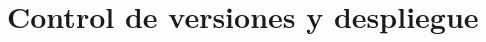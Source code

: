 %
%
%
%
%

\section{Control de versiones y despliegue}
\label{sec:herramientas_control_versiones_despliegue}

